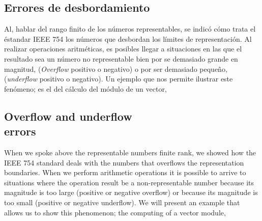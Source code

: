 \begin{paracol}{2}
\subsection{Errores de desbordamiento}

Al, hablar del rango finito de los números representables, se indicó cómo trata el éstandar IEEE 754 los números que desbordan los límites de representación. Al realizar operaciones aritméticas, es posibles llegar a situaciones en las que el resultado sea un número no representable bien por se demasiado grande en magnitud, (\emph{Overflow} positivo o negativo) o por ser demasiado pequeño, (\emph{underflow} positivo o negativo). Un ejemplo que nos permite ilustrar este fenómeno; es el del cálculo del módulo de un vector,

\switchcolumn
\subsection{Overflow and underflow\\ errors}
When we spoke above the representable numbers finite rank, we showed how the IEEE 754 standard deals with the numbers that overflows the representation boundaries. When we perform arithmetic operations it is possible to arrive to situations where the operation result be a non-representable number because its magnitude is too large (positive or negative overflow) or because its magnitude  is too small (positive or negative underflow). We will present an example that allows us to show this phenomenon; the computing of a vector module,     
\end{paracol}

